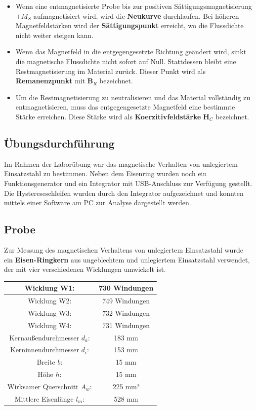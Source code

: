 \documentclass[a4paper,twoside,12pt,DIV=13,BCOR=5mm,numbers=noenddot,cleardoublepage=empty]{scrbook}
\begin{document}
    \begin{itemize}
        \item Wenn eine entmagnetisierte Probe bis zur positiven Sättigungsmagnetisierung $+M_S$ aufmagnetisiert wird, wird die \textbf{Neukurve} durchlaufen. Bei höheren Magnetfeldstärken wird der \textbf{Sättigungspunkt} erreicht, wo die Flussdichte nicht weiter steigen kann.
        \item Wenn das Magnetfeld in die entgegengesetzte Richtung geändert wird, sinkt die magnetische Flussdichte nicht sofort auf Null. Stattdessen bleibt eine Restmagnetisierung im Material zurück. Dieser Punkt wird als \textbf{Remanenzpunkt} mit \textbf{B$_R$} bezeichnet.
        \item Um die Restmagnetisierung zu neutralisieren und das Material vollständig zu entmagnetisieren, muss das entgegengesetzte Magnetfeld eine bestimmte Stärke erreichen. Diese Stärke wird als \textbf{Koerzitivfeldstärke} \textbf{H$_C$} bezeichnet. \\
    \end{itemize}
    
    \subsection{Übungsdurchführung}
    
    Im Rahmen der Laborübung war das magnetische Verhalten von unlegiertem Einsatzstahl zu bestimmen. Neben dem Eisenring wurden noch ein Funktionsgenerator und ein Integrator mit USB-Anschluss zur Verfügung gestellt. Die Hystereseschleifen wurden durch den Integrator aufgezeichnet und konnten mittels einer Software am PC zur Analyse dargestellt werden.
    
    \subsection{Probe}

    Zur Messung des magnetischen Verhaltens von unlegiertem Einsatzstahl wurde ein \textbf{Eisen-Ringkern} aus ungeblechtem und unlegiertem Einsatzstahl verwendet, der mit vier verschiedenen Wicklungen umwickelt ist.

    \begin{center}
    \begin{tabular}{|c|c|} \hline
    Wicklung W1: & 730 Windungen \\ \hline
    Wicklung W2: & 749 Windungen \\ \hline
    Wicklung W3: & 732 Windungen \\ \hline
    Wicklung W4: & 731 Windungen \\ \hline
    Kernaußendurchmesser $d_a$: & 183 mm \\ \hline
    Kerninnendurchmesser $d_i$: & 153 mm \\ \hline
    Breite $b$: & 15 mm \\ \hline
    Höhe $h$: & 15 mm \\ \hline
    Wirksamer Querschnitt $A_w$: & 225 mm² \\ \hline
    Mittlere Eisenlänge $l_m$: & 528 mm \\ \hline
    \end{tabular}
    \end{center}
    
\end{document}
